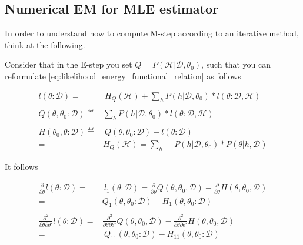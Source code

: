 \documentclass[11pt]{article}
\begin{document}
\begin{article}
\subsection{Numerical EM for MLE estimator}
\label{sec:org8bd58f8}

In order to understand how to compute M-step according to an
iterative method, think at the following.

Consider that in the E-step you set \(Q = P (\mathscr{H}| \mathscr{D}, \theta_0)\), such
that you can reformulate
\ref{eq:likelihood_energy_functional_relation} as follows

\begin{align} \label{eq:likelihood_energy_iterative}
l (\theta: \mathscr{D}) =& \ H_Q (\mathscr {H}) + \sum_h P(h | \mathscr{D}, \theta_0) * l (\theta: \mathscr{D}, \mathscr{H}) \\
\nonumber\\
Q(\theta, \theta_0 : \mathscr{D}) \eqdef& \sum_h P(h | \mathscr{D}, \theta_0) * l (\theta: \mathscr{D}, \mathscr{H})\\
\nonumber\\  
H(\theta_0, \theta: \mathscr{D}) \eqdef& \ Q(\theta, \theta_0 : \mathscr{D}) - l (\theta: \mathscr{D}) \\
                                 =& H_Q (\mathscr {H}) = \sum_h - P(h | \mathscr{D}, \theta_0) * P(\theta | h, \mathscr{D}) \nonumber
\end{align}

It follows

\begin{align} 
\frac{\partial}{\partial \theta} l (\theta: \mathscr{D}) =& \ l_1 (\theta: \mathscr{D}) = \frac{\partial}{\partial \theta} Q(\theta, \theta_0, \mathscr{D}) - \frac{\partial}{\partial \theta} H(\theta, \theta_0, \mathscr{D}) \nonumber \\
=& Q_1(\theta, \theta_0 : \mathscr{D}) - H_1(\theta, \theta_0 : \mathscr{D})  \label{eq:m-condition-iterative1} \\
\nonumber \\
\frac{\partial^2}{\partial \theta \partial \theta'} l (\theta: \mathscr{D}) =& \frac{\partial^2}{\partial \theta \partial \theta'}  Q(\theta, \theta_0, \mathscr{D}) -  \frac{\partial^2}{\partial \theta \partial \theta'}  H(\theta, \theta_0, \mathscr{D}) \nonumber \\
  =& \ Q_{11}(\theta, \theta_0 : \mathscr{D}) - H_{11}(\theta, \theta_0 : \mathscr{D}) \label{eq:m-condition-iterative2}
\end{align}


\end{article}
\end{document}
